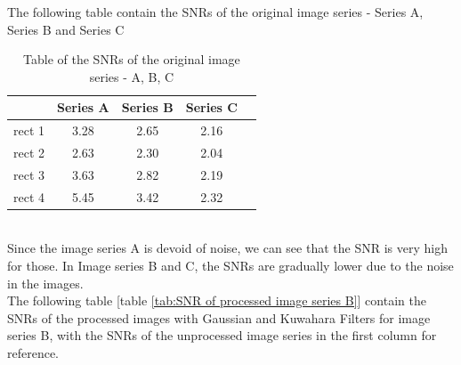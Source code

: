 \documentclass[runningheads]{llncs}
\begin{document}
The following table contain the SNRs of the original image series - Series A, Series B and Series C

\begin{table}[h!]
\centering
\begin{tabular}{|c|c|c|c|c|}
\hline
\textbf{} & \textbf{Series A} & \textbf{Series B} & \textbf{Series C}\\ \hline
rect 1 & 3.28 & 2.65 &  2.16 \\ \hline
rect 2 & 2.63 & 2.30  & 2.04 \\ \hline
rect 3 & 3.63 & 2.82  &  2.19 \\ \hline
rect 4 & 5.45 & 3.42  & 2.32\\ \hline
\end{tabular}
\caption{Table of the SNRs of the original image series - A, B, C}
\label{tab:SNR-original}
\end{table}
~\\ Since the image series A is devoid of noise, we can see that the SNR is very high for those. In Image series B and C, the SNRs are gradually lower due to the noise in the images. 
~\\The following table [table \ref{tab:SNR of processed image series B}] contain the SNRs of the processed images with Gaussian and Kuwahara Filters for image series B, with the SNRs of the unprocessed image series in the first column for reference.
\end{document}
